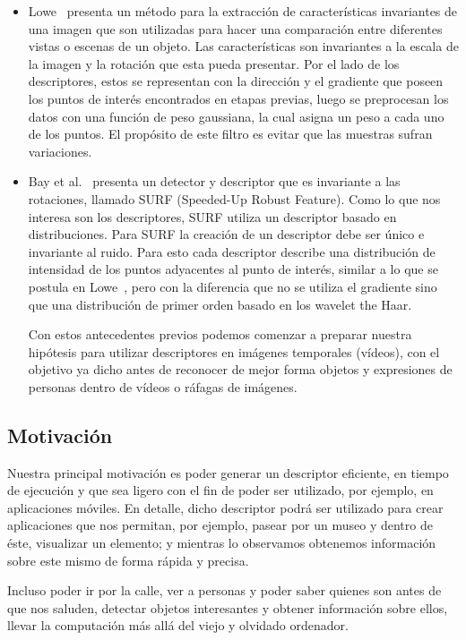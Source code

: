 \documentclass[a4paper,12pt]{article}
\begin{document}
\begin{itemize}
		\item Lowe~\cite{sift} presenta un método para la extracción de características invariantes de una imagen que son utilizadas para hacer una comparación entre diferentes vistas o escenas de un objeto. Las características son invariantes a la escala de la imagen y la rotación que esta pueda presentar. Por el lado de los descriptores, estos se representan con la dirección y el gradiente que poseen los puntos de interés encontrados en etapas previas, luego se preprocesan los datos con una función de peso gaussiana, la cual asigna un peso a cada uno de los puntos. El propósito de este filtro es evitar que las muestras sufran variaciones.

		\item Bay et al.~\cite{surf} presenta un detector y descriptor que es invariante a las rotaciones, llamado SURF (Speeded-Up Robust Feature). Como lo que nos interesa son los descriptores, SURF utiliza un descriptor basado en distribuciones. Para SURF la creación de un descriptor debe ser único e invariante al ruido. Para esto cada descriptor describe una distribución de intensidad de los puntos adyacentes al punto de interés, similar a lo que se postula en Lowe~\cite{sift}, pero con la diferencia que no se utiliza el gradiente sino que una distribución de primer orden basado en los wavelet the Haar.

Con estos antecedentes previos podemos comenzar a preparar nuestra hipótesis para utilizar descriptores en imágenes temporales (vídeos), con el objetivo ya dicho antes de reconocer de mejor forma objetos y expresiones de personas dentro de vídeos o ráfagas de imágenes.
\end{itemize}
\subsection{Motivación}
Nuestra principal motivación es poder generar un descriptor eficiente, en tiempo de ejecución y que sea ligero con el fin de poder ser utilizado, por ejemplo, en aplicaciones móviles. En detalle, dicho descriptor podrá ser utilizado para crear aplicaciones que nos permitan, por ejemplo, pasear por un museo y dentro de éste, visualizar un elemento; y mientras lo observamos obtenemos información sobre este mismo de forma rápida y precisa.

Incluso poder ir por la calle, ver a personas  y poder saber quienes son antes de que nos saluden, detectar objetos interesantes y obtener información sobre ellos, llevar la computación más allá del viejo y olvidado ordenador.
\end{document}
